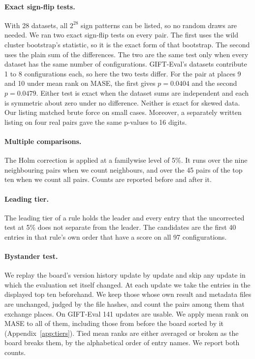 \documentclass{article}
\begin{document}
\paragraph{Exact sign-flip tests.} With 28 datasets, all $2^{28}$ sign patterns can be
listed, so no random draws are needed. We ran two exact sign-flip tests on every pair. The
first uses the wild cluster bootstrap's statistic, so it is the exact form of that bootstrap.
The second uses the plain sum of the differences. The two are the same test only when every
dataset has the same number of configurations. GIFT-Eval's datasets contribute 1 to 8
configurations each, so here the two tests differ. For the pair at places 9 and 10 under mean
rank on MASE, the first gives $p = 0.0404$ and the second $p = 0.0479$. Either test is exact
when the dataset sums are independent and each is symmetric about zero under no difference.
Neither is exact for skewed data. Our listing matched brute force on small cases. Moreover, a
separately written listing on four real pairs gave the same p-values to 16 digits.

\paragraph{Multiple comparisons.} The Holm correction \citep{holm1979} is applied at a
familywise level of 5\%. It runs over the nine neighbouring pairs when we count neighbours, and
over the 45 pairs of the top ten when we count all pairs. Counts are reported before and after
it.

\paragraph{Leading tier.} The leading tier of a rule holds the leader and every entry that
the uncorrected test at 5\% does not separate from the leader. The candidates are the first 40
entries in that rule's own order that have a score on all 97 configurations.

\paragraph{Bystander test.} We replay the board's version history update by update and skip
any update in which the evaluation set itself changed. At each update we take the entries in
the displayed top ten beforehand. We keep those whose own result and metadata files are
unchanged, judged by the file hashes, and count the pairs among them that exchange places. On
GIFT-Eval 141 updates are usable. We apply mean rank on MASE to all of them, including those
from before the board sorted by it (Appendix~\ref{app:tiers}). Tied mean ranks are either
averaged or broken as the board breaks them, by the alphabetical order of entry names. We
report both counts.
\end{document}
